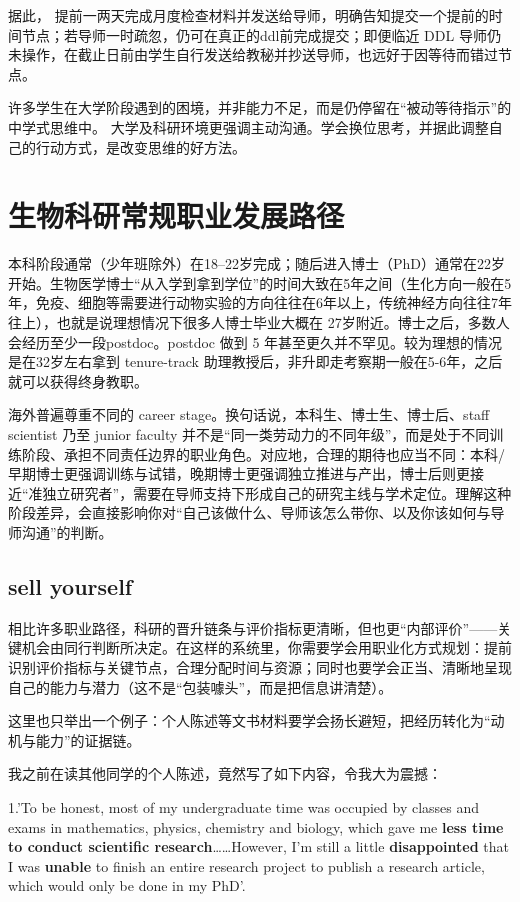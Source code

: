 据此，
提前一两天完成月度检查材料并发送给导师，明确告知提交一个提前的时间节点；若导师一时疏忽，仍可在真正的ddl前完成提交；即便临近 DDL 导师仍未操作，在截止日前由学生自行发送给教秘并抄送导师，也远好于因等待而错过节点。

许多学生在大学阶段遇到的困境，并非能力不足，而是仍停留在“被动等待指示”的中学式思维中。
大学及科研环境更强调主动沟通。学会换位思考，并据此调整自己的行动方式，是改变思维的好方法。

\section{生物科研常规职业发展路径}

本科阶段通常（少年班除外）在18–22岁完成；随后进入博士（PhD）通常在22岁开始。生物医学博士“从入学到拿到学位”的时间大致在5年之间（生化方向一般在5年，免疫、细胞等需要进行动物实验的方向往往在6年以上，传统神经方向往往7年往上），也就是说理想情况下很多人博士毕业大概在 27岁附近。博士之后，多数人会经历至少一段postdoc。postdoc 做到 5 年甚至更久并不罕见。较为理想的情况是在32岁左右拿到 tenure-track 助理教授后，非升即走考察期一般在5-6年，之后就可以获得终身教职。

海外普遍尊重不同的 career stage。换句话说，本科生、博士生、博士后、staff scientist 乃至 junior faculty 并不是“同一类劳动力的不同年级”，而是处于不同训练阶段、承担不同责任边界的职业角色。对应地，合理的期待也应当不同：本科/早期博士更强调训练与试错，晚期博士更强调独立推进与产出，博士后则更接近“准独立研究者”，需要在导师支持下形成自己的研究主线与学术定位。理解这种阶段差异，会直接影响你对“自己该做什么、导师该怎么带你、以及你该如何与导师沟通”的判断。

\subsection{sell yourself}
相比许多职业路径，科研的晋升链条与评价指标更清晰，但也更“内部评价”——关键机会由同行判断所决定。在这样的系统里，你需要学会用职业化方式规划：提前识别评价指标与关键节点，合理分配时间与资源；同时也要学会正当、清晰地呈现自己的能力与潜力（这不是“包装噱头”，而是把信息讲清楚）。

这里也只举出一个例子：个人陈述等文书材料要学会扬长避短，把经历转化为“动机与能力”的证据链。

我之前在读其他同学的个人陈述，竟然写了如下内容，令我大为震撼：

1.'To be honest, most of my undergraduate time was occupied by classes and exams in mathematics, physics, chemistry and biology, which gave me \textbf{less time to conduct scientific research}……However, I'm still a little \textbf{disappointed} that I was \textbf{unable} to finish an entire research project to publish a research article, which would only be done in my PhD'.

